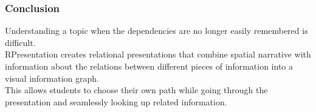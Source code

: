 \begin{frame}
  \frametitle{Conclusion}
  \begin{module}[id=conclusion]

Understanding a topic when the dependencies are no longer easily remembered is difficult.\\

RPresentation creates relational presentations that combine spatial narrative with information about the relations between different pieces of information into a visual information graph.\\

This allows students to choose their own path while going through the presentation and seamlessly looking up related information.\\

  \end{module}
\end{frame}
